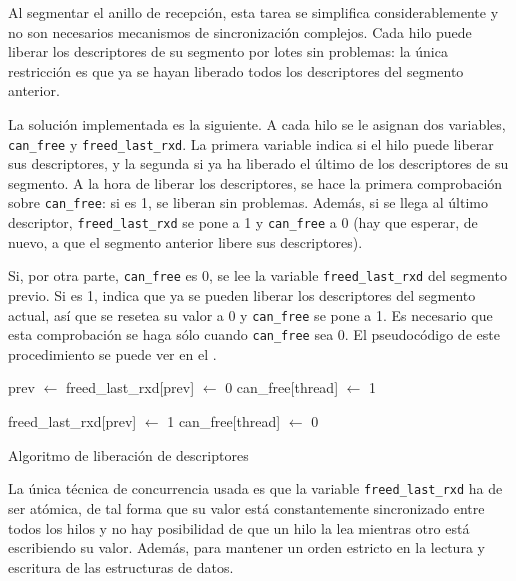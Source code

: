 \documentclass[twoside, 12pt]{epstfg}
\begin{document}
Al segmentar el anillo de recepción, esta tarea se simplifica considerablemente y no son necesarios mecanismos de sincronización complejos. Cada hilo puede liberar los descriptores de su segmento por lotes sin problemas: la única restricción es que ya se hayan liberado todos los descriptores del segmento anterior.

La solución implementada es la siguiente. A cada hilo se le asignan dos variables, \texttt{can\_free} y \texttt{freed\_last\_rxd}. La primera variable indica si el hilo puede liberar sus descriptores, y la segunda si ya ha liberado el último de los descriptores de su segmento. A la hora de liberar los descriptores, se hace la primera comprobación sobre \texttt{can\_free}: si es 1, se liberan sin problemas. Además, si se llega al último descriptor, \texttt{freed\_last\_rxd} se pone a 1 y \texttt{can\_free} a 0 (hay que esperar, de nuevo, a que el segmento anterior libere sus descriptores).

Si, por otra parte, \texttt{can\_free} es 0, se lee la variable \texttt{freed\_last\_rxd} del segmento previo. Si es 1, indica que ya se pueden liberar los descriptores del segmento actual, así que se resetea su valor a 0 y \texttt{can\_free} se pone a 1. Es necesario que esta comprobación se haga sólo cuando \texttt{can\_free} sea 0. El pseudocódigo de este procedimiento se puede ver en el .

\begin{algorithm}[btp]
\begin{algorithmic}
\State prev $\gets$ 
		\State freed\_last\_rxd[prev] $\gets$ 0
		\State can\_free[thread] $\gets$ 1
		\State {}
	\EndIf

		\State {}

			\State {}
			\State freed\_last\_rxd[prev] $\gets$ 1
			\State can\_free[thread] $\gets$ 0
		\EndIf
	\EndIf
\EndFunction
\end{algorithmic}
\caption{Algoritmo de liberación de descriptores}
\label{lst:AlgoritmoDescriptores}
\end{algorithm}

La única técnica de concurrencia usada es que la variable \texttt{freed\_last\_rxd} ha de ser atómica, de tal forma que su valor está constantemente sincronizado entre todos los hilos y no hay posibilidad de que un hilo la lea mientras otro está escribiendo su valor. Además, para mantener un orden estricto en la lectura y escritura de las estructuras de datos.
\end{document}
